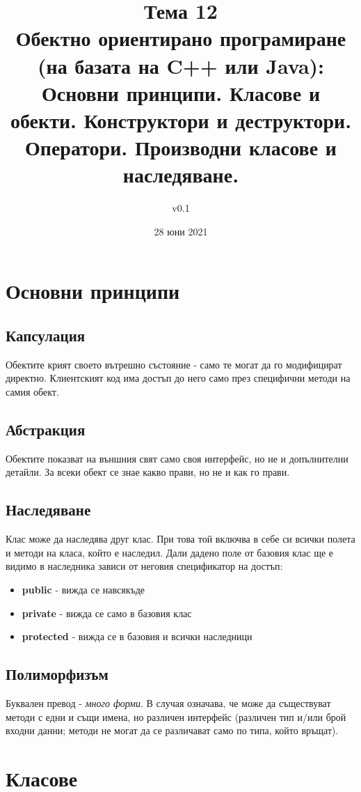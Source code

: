 \documentclass[fleqn,12pt]{article}
\title{Тема 12\\Обектно ориентирано програмиране (на базата на C++ или Java): Основни
принципи. Класове и обекти. Конструктори и деструктори. Оператори.
Производни класове и наследяване.}
\author{v0.1}
\date{28 юни 2021}
\begin{document}
\maketitle

\tableofcontents

\section{Основни принципи}
\subsection{Капсулация}
Обектите крият своето вътрешно състояние - само те могат да го модифицират директно. 
Клиентският код има достъп до него само през специфични методи на самия обект.

\subsection{Абстракция}
Обектите показват на външния свят само своя интерфейс, но не и допълнителни детайли. 
За всеки обект се знае какво прави, но не и как го прави.

\subsection{Наследяване}
Клас може да наследява друг клас. При това той включва в себе си всички полета и методи на класа, който е наследил.
Дали дадено поле от базовия клас ще е видимо в наследника зависи от неговия спецификатор на достъп:
\begin{itemize}
    \item \textbf{public} - вижда се навсякъде
    \item \textbf{private} - вижда се само в базовия клас
    \item \textbf{protected} - вижда се в базовия и всички наследници
\end{itemize}

\subsection{Полиморфизъм}
Буквален превод - \textit{много форми}. В случая означава, че може да съществуват методи с едни и същи имена, но различен интерфейс (различен тип и/или брой входни данни; методи не могат да се различават само по типа, който връщат).

\section{Класове}
\end{document}
